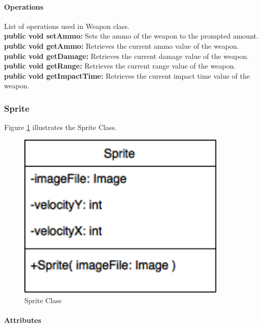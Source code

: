\documentclass[12pt]{article} %
\begin{document}
\paragraph{Operations \\}
List of operations used in Weapon class.\\
\textbf{public void setAmmo:} Sets the ammo of the weapon to the prompted amount. \\
\textbf{public void getAmmo:} Retrieves the current ammo value of the weapon. \\
\textbf{public void getDamage:} Retrieves the current damage value of the weapon. \\
\textbf{public void getRange:} Retrieves the current range value of the weapon. \\
\textbf{public void getImpactTime:} Retrieves the current impact time value of the weapon. 


\subsubsection{Sprite} %

Figure \ref{fig:sprite} illustrates the Sprite Class.
\begin{figure}[h!]
   \centering
   \vspace{10pt}%
   \includegraphics[width=10cm]{sprite.png}
   \caption{Sprite Class}
   \label{fig:sprite}
\end{figure}

\paragraph{Attributes\\}
\end{document}
